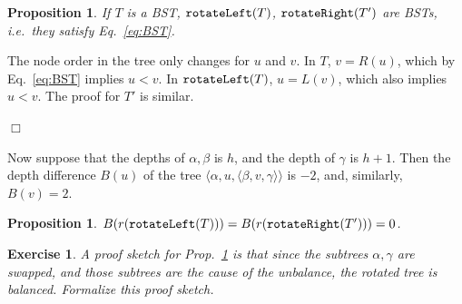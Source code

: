 \documentclass[a4paper]{book}
\theoremstyle{changebreak}                %
\newtheorem{prop}[result]{Proposition}
\newtheorem{ex}[result]{Exercise}
\newenvironment{proof}
 {{\sl Proof.}\hspace*{1 ex}}%
 {{\nopagebreak\hspace*{\fill}$\Box$\par\vspace{12pt}}}
\begin{document}
\begin{prop}
If $T$ is a BST, $\mbox{\tt rotateLeft}(T)$, $\mbox{\tt
  rotateRight}(T')$ are BSTs, i.e.~they satisfy Eq.~\eqref{eq:BST}.
\end{prop}
\begin{proof}
The node order in the tree only changes for $u$ and
$v$. In $T$, $v=R(u)$, which by Eq.~\eqref{eq:BST} implies $u<v$. In
$\mbox{\tt rotateLeft}(T)$, $u=L(v)$, which also implies $u<v$. The
proof for $T'$ is similar.
\end{proof}

Now suppose that the depths of $\alpha,\beta$ is $h$, and
the depth of $\gamma$ is $h+1$. Then the depth
difference $B(u)$ of the tree
$\langle\alpha,u,\langle\beta,v,\gamma\rangle\rangle$ is $-2$, and,
similarly, $B(v)=2$.

\begin{prop}
$B(r(\mbox{\tt rotateLeft}(T)))=B(r(\mbox{\tt rotateRight}(T')))=0$.
\label{prop:rot}
\end{prop}

\begin{ex}
A proof sketch for Prop.~\ref{prop:rot} is that since the
subtrees $\alpha,\gamma$ are swapped, and those
subtrees are the cause of the unbalance, the rotated
tree is balanced. Formalize this proof sketch.
\end{ex}
\end{document}
